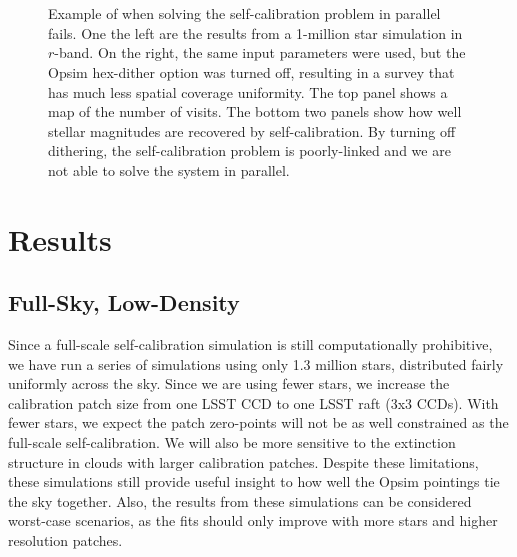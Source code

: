 \documentclass[12pt,preprint]{aastex}
\begin{document}
\begin{figure}
\\
\\
\caption{Example of when solving the self-calibration problem in parallel fails.  One the left are the results from a 1-million star simulation in $r$-band.  On the right, the same input parameters were used, but the Opsim hex-dither option was turned off, resulting in a survey that has much less spatial coverage uniformity.  The top panel shows a map of the number of visits.  The bottom two panels show how well stellar magnitudes are recovered by self-calibration.  By turning off dithering, the self-calibration problem is poorly-linked and we are not able to solve the system in parallel.  \label{fig:nodither}}
\end{figure}






\section{Results}



\subsection{Full-Sky, Low-Density}\label{sec:fsld}

Since a full-scale self-calibration simulation is still computationally prohibitive, we have run a series of simulations using only 1.3 million stars, distributed fairly uniformly across the sky.  Since we are using fewer stars, we increase the calibration patch size from one LSST CCD to one LSST raft (3x3 CCDs).  With fewer stars, we expect the patch zero-points will not be as well constrained as the full-scale self-calibration.  We will also be more sensitive to the extinction structure in clouds with larger calibration patches.  Despite these limitations, these simulations still provide useful insight to how well the Opsim pointings tie the sky together.  Also, the results from these simulations can be considered worst-case scenarios, as the fits should only improve with more stars and higher resolution patches.
\end{document}

